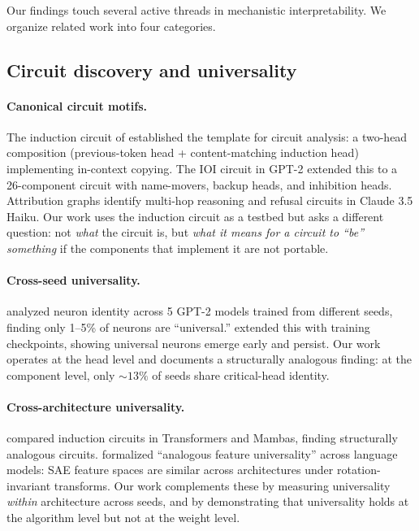\documentclass[final]{article}
\begin{document}
Our findings touch several active threads in mechanistic interpretability. We
organize related work into four categories.

\subsection{Circuit discovery and universality}

\paragraph{Canonical circuit motifs.}
The induction circuit of \citet{olsson2022induction} established the template
for circuit analysis: a two-head composition (previous-token head +
content-matching induction head) implementing in-context copying. The IOI
circuit in GPT-2 \citep{wang2023ioi} extended this to a 26-component circuit
with name-movers, backup heads, and inhibition heads. Attribution graphs
\citep{ameisen2025attribution} identify multi-hop reasoning and refusal circuits
in Claude 3.5 Haiku. Our work uses the induction circuit as a testbed but asks
a different question: not \emph{what} the circuit is, but \emph{what it means
for a circuit to ``be'' something} if the components that implement it are not
portable.

\paragraph{Cross-seed universality.}
\citet{gurnee2024universal} analyzed neuron identity across 5 GPT-2 models
trained from different seeds, finding only 1--5\% of neurons are ``universal.''
\citet{nandan2025universal} extended this with training checkpoints, showing
universal neurons emerge early and persist. Our work operates at the head level
and documents a structurally analogous finding: at the component level, only
${\sim}13\%$ of seeds share critical-head identity.

\paragraph{Cross-architecture universality.}
\citet{wang2024transformers} compared induction circuits in Transformers and
Mambas, finding structurally analogous circuits. \citet{lan2025universal}
formalized ``analogous feature universality'' across language models: SAE
feature spaces are similar across architectures under rotation-invariant
transforms. Our work complements these by measuring universality \emph{within}
architecture across seeds, and by demonstrating that universality holds at the
algorithm level but not at the weight level.
\end{document}
